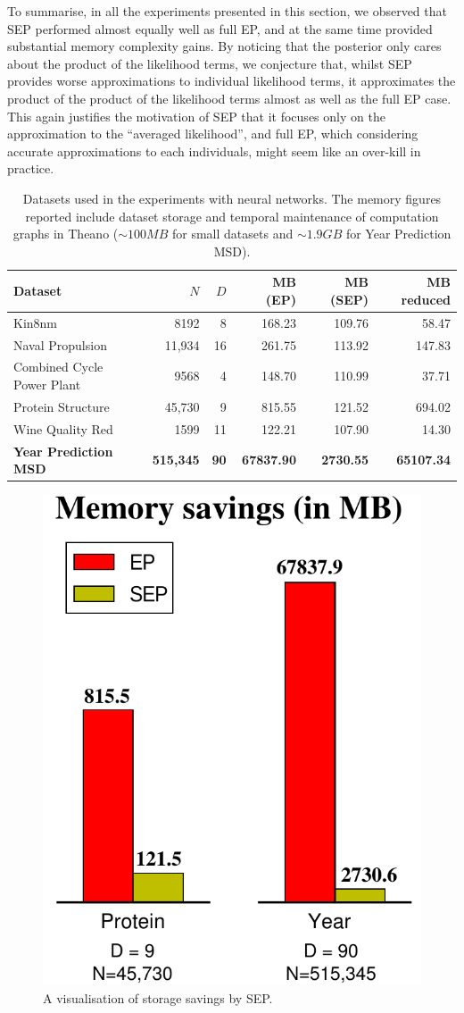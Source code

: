 To summarise, in all the experiments presented in this section, we observed that SEP performed almost equally well as full EP, and at the same time provided substantial memory complexity gains. By noticing that the posterior only cares about the product of the likelihood terms, we conjecture that, whilst SEP provides worse approximations to individual likelihood terms, it approximates the product of the product of the likelihood terms almost as well as the full EP case. This again justifies the motivation of SEP that it focuses only on the approximation to the ``averaged likelihood'', and full EP, which considering accurate approximations to each individuals, might seem like an over-kill in practice.

\begin{table} 
\caption{Datasets used in the experiments with neural networks. The memory figures reported include dataset storage and temporal maintenance of computation graphs in Theano \citep{Bastien-Theano-2012} ($\sim100MB$ for small datasets and $\sim 1.9GB$ for Year Prediction MSD).}
\label{tab:chap3_sep_datasets_neural_networks} 
\centering 
\begin{tabular}{lrrrrr} 
\hline  
\textbf{Dataset} & $N$ & $D$ & MB (EP) & MB (SEP) & MB reduced \tabularnewline 
\hline 
Kin8nm & 8192 & 8 & 168.23 & 109.76 & 58.47 \tabularnewline 
Naval Propulsion & 11,934 & 16 & 261.75 & 113.92 & 147.83 \tabularnewline 
Combined Cycle Power Plant & 9568 & 4 & 148.70 & 110.99 & 37.71 \tabularnewline 
Protein Structure & 45,730 & 9 & 815.55 & 121.52 & 694.02 \tabularnewline 
Wine Quality Red & 1599 & 11 & 122.21 & 107.90 & 14.30 \tabularnewline 
\bf{Year Prediction MSD} & \bf{515,345} & \bf{90} & \bf{67837.90} & \bf{2730.55} & \bf{65107.34} \tabularnewline 
\hline 
\end{tabular}
\end{table}

\begin{figure}
\centering
\includegraphics[width=0.4\linewidth]{Chapter3/sep/fig/memory_saving}
\caption{A visualisation of storage savings by SEP.}
\label{fig:chap3_sep_memory_saving}
\end{figure}
